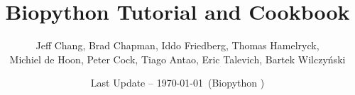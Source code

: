 \documentclass{report}
\begin{document}
\title{Biopython Tutorial and Cookbook}

\author{Jeff Chang, Brad Chapman, Iddo Friedberg, Thomas Hamelryck, \\
Michiel de Hoon, Peter Cock, Tiago Antao, Eric Talevich, Bartek Wilczy\'{n}ski}
\date{Last Update -- \today\ (Biopython \bpversion)}

\maketitle
\tableofcontents


























\end{document}
